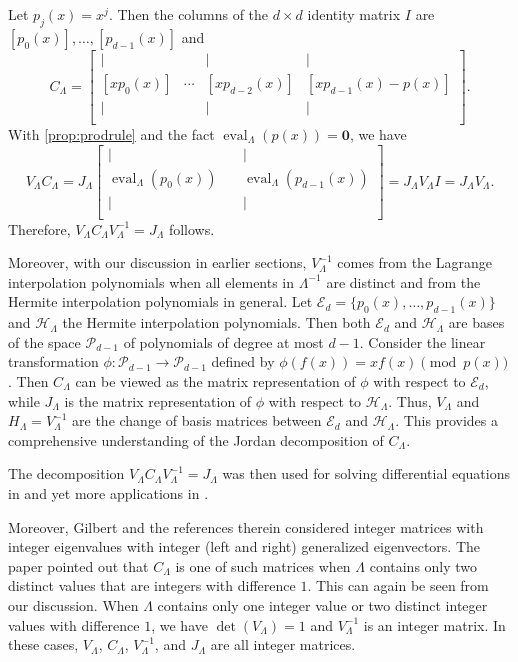 \documentclass{article}
\theoremstyle{definition}
\newcommand{\bzero}{\mathbf{0}}
\newcommand{\eval}{\operatorname{eval}}
\begin{document}
Let $p_j(x) = x^j$.  Then the columns of the $d\times d$ identity matrix $I$ are $[p_0(x)], \ldots, [p_{d-1}(x)]$ and 
\[
    C_\Lambda = \begin{bmatrix}
        | & ~ & | & | \\
        [xp_0(x)] & \cdots & [xp_{d-2}(x)] & [xp_{d-1}(x) - p(x)] \\
        | & ~ & | & | \\
    \end{bmatrix}.
\]
With \cref{prop:prodrule} and the fact $\eval_\Lambda(p(x)) = \bzero$, we have 
\[
    V_\Lambda C_\Lambda = 
    J_\Lambda \begin{bmatrix}
        | & ~ & | \\
        \eval_\Lambda(p_0(x)) & ~ & \eval_\Lambda(p_{d-1}(x)) \\
        | & ~ & | \\
    \end{bmatrix} = J_\Lambda V_\Lambda I = J_\Lambda V_\Lambda.
\]
Therefore, $V_\Lambda C_\Lambda V_\Lambda^{-1} = J_\Lambda$ follows.

Moreover, with our discussion in earlier sections, $V_\Lambda^{-1}$ comes from the Lagrange interpolation polynomials when all elements in $\Lambda^{-1}$ are distinct and from the Hermite interpolation polynomials in general.  Let $\mathcal{E}_d = \{p_0(x), \ldots, p_{d-1}(x)\}$ and $\mathcal{H}_\Lambda$ the Hermite interpolation polynomials.  Then both $\mathcal{E}_d$ and $\mathcal{H}_\Lambda$ are bases of the space $\mathcal{P}_{d-1}$ of polynomials of degree at most $d-1$.  Consider the linear transformation $\phi: \mathcal{P}_{d-1} \rightarrow \mathcal{P}_{d-1}$ defined by $\phi(f(x)) = xf(x) \pmod{p(x)}$.  Then $C_\Lambda$ can be viewed as the matrix representation of $\phi$ with respect to $\mathcal{E}_d$, while $J_\Lambda$ is the matrix representation of $\phi$ with respect to $\mathcal{H}_\Lambda$.  Thus, $V_\Lambda$ and $H_\Lambda = V_\Lambda^{-1}$ are the change of basis matrices between $\mathcal{E}_d$ and $\mathcal{H}_\Lambda$.  This provides a comprehensive understanding of the Jordan decomposition of $C_\Lambda$.     


The decomposition $V_\Lambda C_\Lambda V_\Lambda^{-1} = J_\Lambda$ was then used for solving differential equations in \cite{Brand68} and yet more applications in \cite{MacDuffee50,Watkins78,EM95}.  

Moreover, Gilbert \cite{Gilbert88} and the references therein considered integer matrices with integer eigenvalues with integer (left and right) generalized eigenvectors.  The paper pointed out that $C_\Lambda$ is one of such matrices when $\Lambda$ contains only two distinct values that are integers with difference $1$.  This can again be seen from our discussion.  When $\Lambda$ contains only one integer value or two distinct integer values with difference $1$, we have $\det(V_\Lambda) = 1$ and $V_\Lambda^{-1}$ is an integer matrix.  In these cases, $V_\Lambda$, $C_\Lambda$, $V_\Lambda^{-1}$, and $J_\Lambda$ are all integer matrices.
\end{document}

